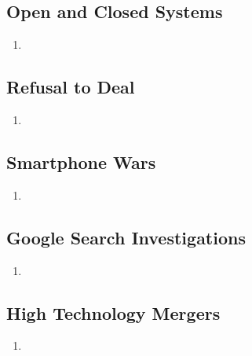 \subsection{Open and Closed Systems} %

\begin{enumerate}
    \item 
\end{enumerate}

\subsection{Refusal to Deal} %

\begin{enumerate}
    \item 
\end{enumerate}

\subsection{Smartphone Wars} %

\begin{enumerate}
    \item 
\end{enumerate}

\subsection{Google Search Investigations} %

\begin{enumerate}
    \item 
\end{enumerate}

\subsection{High Technology Mergers} %

\begin{enumerate}
    \item 
\end{enumerate}
